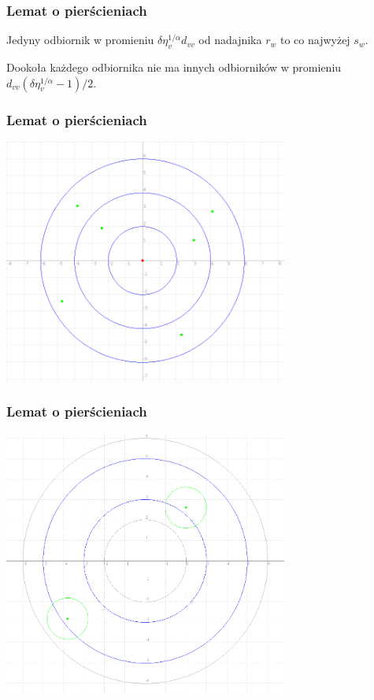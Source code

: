 \documentclass[polish, t,10pt]{beamer}
\begin{document}
\begin{frame}
    \frametitle{Lemat o pierścieniach}
    \begin{lemma}
        Jedyny odbiornik w promieniu $\delta \eta_v^{1/\alpha} d_{vv}$ od nadajnika $r_w$ to
        co najwyżej $s_w$.
    \end{lemma}
    \pause
    \begin{lemma}
        Dookoła każdego odbiornika nie ma innych odbiorników w promieniu $d_{vv}(\delta\eta_v^{1/\alpha} - 1)/2$.
    \end{lemma}
\end{frame}

\begin{frame}
    \frametitle{Lemat o pierścieniach}
    \centering
    \includegraphics[width=0.7\textwidth]{pictures/rings.png}
\end{frame}

\begin{frame}
    \frametitle{Lemat o pierścieniach}
    \centering
    \includegraphics[width=0.7\textwidth]{pictures/bigger-rings.png}
\end{frame}
\end{document}
